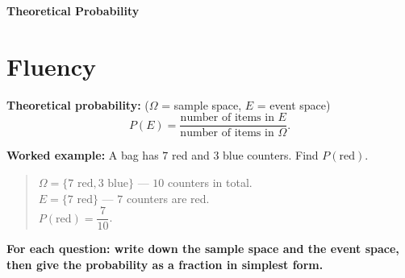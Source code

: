 \documentclass[11pt]{article}
\begin{document}
\thispagestyle{firstpage}

\begin{center}
  {\Large\bfseries Theoretical Probability}
\end{center}
\vspace{0.3em}

\section*{Fluency}

\noindent\textbf{Theoretical probability:} ($\Omega$ = sample space, $E$ = event space)
\[
  P(E) = \frac{\text{number of items in } E}{\text{number of items in } \Omega}.
\]

\vspace{0.3em}
\noindent\textbf{Worked example:} A bag has $7$ red and $3$ blue counters. Find $P(\text{red})$.
\begin{quote}
\noindent $\Omega = \{7 \text{ red}, 3 \text{ blue}\}$ --- $10$ counters in total. \\
$E = \{7 \text{ red}\}$ --- $7$ counters are red. \\
$P(\text{red}) = \dfrac{7}{10}$.
\end{quote}

\vspace{0.3em}
\noindent\textbf{For each question: write down the sample space and the event space, then give
the probability as a fraction in simplest form.}
\end{document}
